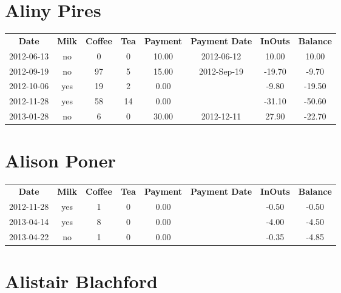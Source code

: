 \section{Aliny Pires}

\begin{center}
\begin{tabular}{cccccccc}
\textbf{Date} & \textbf{Milk} & \textbf{Coffee} & \textbf{Tea} & \textbf{Payment} & \textbf{Payment Date} & \textbf{InOuts} & \textbf{Balance} \\
2012-06-13 & no &  0 &  0 & 10.00 & 2012-06-12 &  10.00 &  10.00\\ 
2012-09-19 & no & 97 &  5 & 15.00 & 2012-Sep-19 & -19.70 &  -9.70\\ 
2012-10-06 & yes & 19 &  2 &  0.00 &  &  -9.80 & -19.50\\ 
2012-11-28 & yes & 58 & 14 &  0.00 &  & -31.10 & -50.60\\ 
2013-01-28 & no &  6 &  0 & 30.00 & 2012-12-11 &  27.90 & -22.70
\end{tabular}
\end{center}

\section{Alison Poner}

\begin{center}
\begin{tabular}{cccccccc}
\textbf{Date} & \textbf{Milk} & \textbf{Coffee} & \textbf{Tea} & \textbf{Payment} & \textbf{Payment Date} & \textbf{InOuts} & \textbf{Balance} \\
2012-11-28 & yes & 1 & 0 & 0.00 &  & -0.50 & -0.50\\ 
2013-04-14 & yes & 8 & 0 & 0.00 &  & -4.00 & -4.50\\ 
2013-04-22 & no & 1 & 0 & 0.00 &  & -0.35 & -4.85
\end{tabular}
\end{center}

\section{Alistair Blachford}

